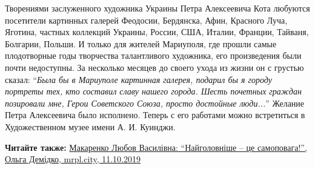 Творениями заслуженного художника Украины Петра Алексеевича Кота любуются
посетители картинных галерей Феодосии, Бердянска, Афин, Красного Луча, Яготина,
частных коллекций Украины, России, США, Италии, Франции, Тайваня, Болгарии,
Польши. И только для жителей Мариуполя, где прошли самые плодотворные годы
творчества талантливого художника, его произведения были почти недоступны. За
несколько месяцев до своего ухода из жизни он с грустью сказал: \enquote{\em Была бы в
Мариуполе картинная галерея, подарил бы я городу портреты тех, кто составил
славу нашего города. Шесть почетных граждан позировали мне, Герои Советского
Союза, просто достойные люди...} Желание Петра Алексеевича было исполнено. Теперь
с его работами можно встретиться в Художественном музее имени А. И. Куинджи.

\textbf{Читайте также:} \href{https://mrpl.city/blogs/view/makarenko-lyubov-vasilivna-najgolovnishetse-samopovaga}{%
Макаренко Любов Василівна: \enquote{Найголовніше – це самоповага!}, Ольга Демідко, mrpl.city, 11.10.2019}
